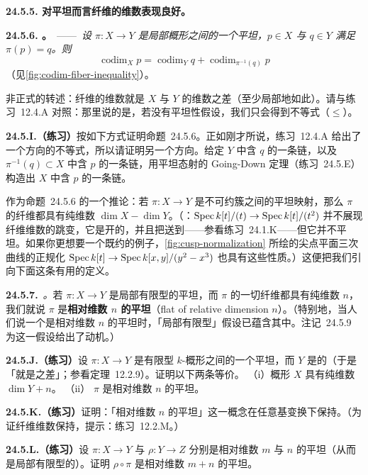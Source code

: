 \textbf{24.5.5. 对平坦\trMorphism{}而言纤维的维数表现良好。}

\textbf{24.5.6. \trhProposition。}\ ——\ \emph{设 $\pi\colon X\to Y$ 是局部\trNoether{}概形之间的一个平坦\trMorphism，$p\in X$ 与 $q\in Y$ 满足 $\pi(p)=q$。则}
\[
\operatorname{codim}_X p=\operatorname{codim}_Y q+\operatorname{codim}_{\pi^{-1}(q)}p
\]
（见\cref{fig:codim-fiber-inequality}）。

非正式的转述：纤维的维数就是 $X$ 与 $Y$ 的维数之差（至少局部地如此）。请与\mbox{练习~12.4.A} 对照：那里说的是，若没有平坦性假设，我们只会得到不等式（$\le$）。

\textbf{24.5.I.（练习）}\quad 按如下方式证明\mbox{命题~24.5.6}。正如刚才所说，\mbox{练习~12.4.A} 给出了一个方向的不等式，所以请证明另一个方向。给定 $Y$ 中含 $q$ 的一条\trIrreducible\trClosedSubset{}链，以及 $\pi^{-1}(q)\subset X$ 中含 $p$ 的一条\trIrreducible\trClosedSubset{}链，用平坦态射的 Going-Down 定理（\mbox{练习~24.5.E}）构造出 $X$ 中含 $p$ 的一条\trIrreducible\trClosedSubset{}链。

作为\mbox{命题~24.5.6} 的一个推论：若 $\pi\colon X\to Y$ 是不可约簇之间的平坦映射，那么 $\pi$ 的纤维都具有纯维数 $\dim X-\dim Y$。（\trhWarning{}：$\operatorname{Spec} k[t]/(t)\to\operatorname{Spec} k[t]/(t^{2})$ 并不展现纤维维数的跳变，它是开的，并且把\trAssociatedPoint{}送到\trAssociatedPoint——参看\mbox{练习~24.1.K}——但它并不平坦。如果你更想要一个既约的例子，\cref{fig:cusp-normalization} 所绘的尖点平面三次曲线的正规化 $\operatorname{Spec} k[t]\to\operatorname{Spec} k[x,y]/(y^{2}-x^{3})$ 也具有这些性质。）这便把我们引向下面这条有用的定义。

\textbf{24.5.7.}\ \emph{\trhDefinition。}\quad 若 $\pi\colon X\to Y$ 是局部有限型的平坦\trMorphism，而 $\pi$ 的一切纤维都具有纯维数 $n$，我们就说 $\pi$ 是\textbf{相对维数 $n$ 的平坦}（flat of relative dimension $n$）。（特别地，当人们说一个\trMorphism{}是相对维数 $n$ 的平坦\trMorphism{}时，「局部有限型」假设已蕴含其中。\mbox{注记~24.5.9} 为这一假设给出了动机。）

\textbf{24.5.J.（练习）}\quad 设 $\pi\colon X\to Y$ 是有限型 $k$-概形之间的一个平坦\trMorphism，而 $Y$ 是\trPureDimensional{}的（于是「\trCodimension{}就是\trDimension{}之差」；参看\mbox{定理~12.2.9}）。证明以下两条等价。
（i）概形 $X$ 具有纯维数 $\dim Y+n$。
（ii）\trMorphism{} $\pi$ 是相对维数 $n$ 的平坦\trMorphism。

\textbf{24.5.K.（练习）}\quad 证明：「相对维数 $n$ 的平坦\trMorphism」这一概念在任意基变换下保持。（为证纤维维数保持，提示：\mbox{练习~12.2.M}。）

\textbf{24.5.L.（练习）}\quad 设 $\pi\colon X\to Y$ 与 $\rho\colon Y\to Z$ 分别是相对维数 $m$ 与 $n$ 的平坦\trMorphism（从而是局部有限型的）。证明 $\rho\circ\pi$ 是相对维数 $m+n$ 的平坦\trMorphism。

